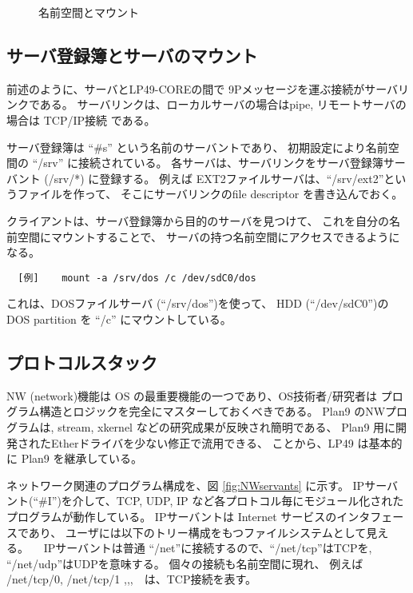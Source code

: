 \documentclass{jarticle}
\begin{document}
\begin{figure}[htb]
  \begin{center}
   \epsfxsize=340pt
    \caption{名前空間とマウント}
    \label{fig:NSmount}
  \end{center}
\end{figure}



\subsection{サーバ登録簿とサーバのマウント}

前述のように、サーバとLP49-COREの間で 9Pメッセージを運ぶ接続がサーバリンクである。
サーバリンクは、ローカルサーバの場合はpipe, リモートサーバの場合は TCP/IP接続
である。

  サーバ登録簿は ``\#s'' という名前のサーバントであり、
  初期設定により名前空間の ``/srv'' に接続されている。
  各サーバは、サーバリンクをサーバ登録簿サーバント (/srv/*) に登録する。
  例えば EXT2ファイルサーバは、``/srv/ext2''というファイルを作って、
  そこにサーバリンクのfile descriptor を書き込んでおく。


  クライアントは、サーバ登録簿から目的のサーバを見つけて、
  これを自分の名前空間にマウントすることで、
  サーバの持つ名前空間にアクセスできるようになる。\\

\begin{verbatim}
  [例]    mount -a /srv/dos /c /dev/sdC0/dos 
\end{verbatim}

これは、DOSファイルサーバ (``/srv/dos'')を使って、
HDD (``/dev/sdC0'')のDOS partition を
``/c'' にマウントしている。


\subsection{プロトコルスタック}

    NW (network)機能は OS の最重要機能の一つであり、OS技術者/研究者は 
  プログラム構造とロジックを完全にマスターしておくべきである。
  Plan9 のNWプログラムは, 
  stream, xkernel などの研究成果が反映され簡明である、
  Plan9 用に開発されたEtherドライバを少ない修正で流用できる、
  ことから、LP49 は基本的に Plan9 を継承している。

  ネットワーク関連のプログラム構成を、図 \ref{fig:NWservants} に示す。
  IPサーバント(``\#I'')を介して、TCP, UDP, IP など各プロトコル毎にモジュール化された
  プログラムが動作している。
  IPサーバントは Internet サービスのインタフェースであり、
  ユーザには以下のトリー構成をもつファイルシステムとして見える。
　IPサーバントは普通 ``/net''に接続するので、``/net/tcp''はTCPを, 
  ``/net/udp''はUDPを意味する。
  個々の接続も名前空間に現れ、
  例えば /net/tcp/0, /net/tcp/1 ,,,　は、TCP接続を表す。
\end{document}
